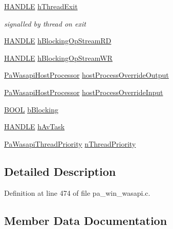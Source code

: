 \begin{DoxyCompactItemize}
\hyperlink{_sound_touch_d_l_l_8h_aa8c0374618b33785ccb02f74bcfebc46}{H\+A\+N\+D\+LE} \hyperlink{struct_pa_wasapi_stream_ad03150fdcbb572f9faf8fed472333e50}{h\+Thread\+Exit}
\begin{DoxyCompactList}\small\item\em signalled by thread on exit \end{DoxyCompactList}\item 
\hyperlink{_sound_touch_d_l_l_8h_aa8c0374618b33785ccb02f74bcfebc46}{H\+A\+N\+D\+LE} \hyperlink{struct_pa_wasapi_stream_a2298014f2cc2a5af5608ce2171c46429}{h\+Blocking\+Op\+Stream\+RD}
\item 
\hyperlink{_sound_touch_d_l_l_8h_aa8c0374618b33785ccb02f74bcfebc46}{H\+A\+N\+D\+LE} \hyperlink{struct_pa_wasapi_stream_a0be8d98886549882563c9b16c2b3009f}{h\+Blocking\+Op\+Stream\+WR}
\item 
\hyperlink{struct_pa_wasapi_host_processor}{Pa\+Wasapi\+Host\+Processor} \hyperlink{struct_pa_wasapi_stream_ae0471e5b5c15f54c59c57980d9faec48}{host\+Process\+Override\+Output}
\item 
\hyperlink{struct_pa_wasapi_host_processor}{Pa\+Wasapi\+Host\+Processor} \hyperlink{struct_pa_wasapi_stream_a07ec66d5779ded1801200467021884e1}{host\+Process\+Override\+Input}
\item 
\hyperlink{nfilterkit_8h_a3be13892ae7076009afcf121347dd319}{B\+O\+OL} \hyperlink{struct_pa_wasapi_stream_a2497dda1ef25d7673f3a67553c2b5a0e}{b\+Blocking}
\item 
\hyperlink{_sound_touch_d_l_l_8h_aa8c0374618b33785ccb02f74bcfebc46}{H\+A\+N\+D\+LE} \hyperlink{struct_pa_wasapi_stream_aae3a56871d156b6d8cfa2e070b408103}{h\+Av\+Task}
\item 
\hyperlink{pa__win__wasapi_8h_a561291b0188f6f29246ea669b48e2661}{Pa\+Wasapi\+Thread\+Priority} \hyperlink{struct_pa_wasapi_stream_a49a89c3dc97a1a541891b75f303ef7f0}{n\+Thread\+Priority}
\end{DoxyCompactItemize}


\subsection{Detailed Description}


Definition at line 474 of file pa\+\_\+win\+\_\+wasapi.\+c.



\subsection{Member Data Documentation}
